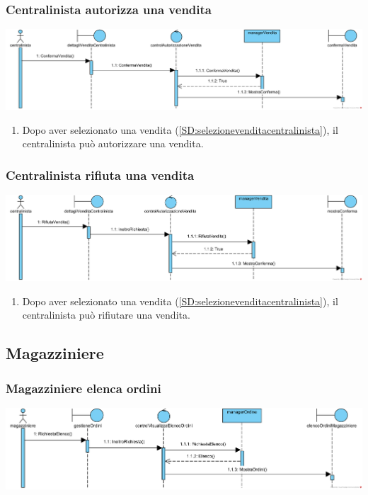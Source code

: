 \documentclass[12pt]{article}
\begin{document}
\subsubsection{Centralinista autorizza una vendita}
\label{SD:centralinistaautorizza}
\begin{center}
\includegraphics[width=\textwidth]{SequenceDiagram/CentralinistaVenditaAutorizza}
\end{center}

\begin{enumerate}
\item Dopo aver selezionato una vendita (\ref{SD:selezionevenditacentralinista}), il centralinista può autorizzare una vendita.
\end{enumerate}

\subsubsection{Centralinista rifiuta una vendita}
\label{SD:centralinistarifiuta}
\begin{center}
\includegraphics[width=\textwidth]{SequenceDiagram/CentralinistaVenditaRifiuta}
\end{center}

\begin{enumerate}
\item Dopo aver selezionato una vendita (\ref{SD:selezionevenditacentralinista}), il centralinista può rifiutare una vendita.
\end{enumerate}

\newpage

\subsection{Magazziniere}
\subsubsection{Magazziniere elenca ordini}
\label{SD:magazzinierevisualizzaelenco}
\begin{center}
\includegraphics[width=\textwidth]{SequenceDiagram/MagazziniereOrdiniElenco}
\end{center}
\end{document}
